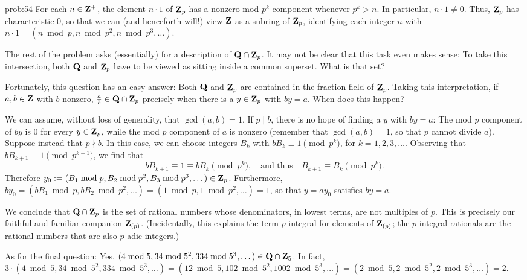 \begin{sol}{prob:54} For each $n \in \mathbf{Z}^{+}$, the element $n\cdot 1$ of $\mathbf{Z}_p$ has a nonzero mod $p^k$ component whenever $p^k > n$. In particular, $n\cdot 1\ne 0$. Thus, $\mathbf{Z}_p$ has characteristic $0$, so that we can (and henceforth will!) view $\mathbf{Z}$ as a subring of $\mathbf{Z}_p$, identifying each integer $n$ with $n\cdot 1 = (n\bmod{p}, n\bmod{p^2}, n\bmod{p^3},\dots)$.

The rest of the problem asks (essentially) for a description of $\mathbf{Q}\cap \mathbf{Z}_p$. It may not be clear that this task even makes sense: To take this intersection, both $\mathbf{Q}$ and $\mathbf{Z}_p$ have to be viewed as sitting inside a common superset. What is that set? 

Fortunately, this question has an easy answer: Both $\mathbf{Q}$ and $\mathbf{Z}_p$ are contained in the fraction field of $\mathbf{Z}_p$. Taking this interpretation, if $a, b \in \mathbf{Z}$ with $b$ nonzero, $\frac{a}{b} \in \mathbf{Q}\cap \mathbf{Z}_p$ precisely when there is a $y \in \mathbf{Z}_p$ with $by=a$. When does this happen?

We can assume, without loss of generality, that $\gcd(a,b)=1$. If $p\mid b$, there is no hope of finding a $y$ with $by=a$: The mod $p$ component of $by$ is $0$ for every $y\in \mathbf{Z}_p$, while the mod $p$ component of $a$ is nonzero (remember that $\gcd(a,b)=1$, so that $p$ cannot divide $a$). Suppose instead that $p\nmid b$. In this case, we can choose integers $B_k$ with $b B_k \equiv 1\pmod{p^k}$, for $k=1,2,3,\dots$. Observing that $bB_{k+1}\equiv 1\pmod{p^{k+1}}$, we find that 
\[ bB_{k+1} \equiv 1 \equiv b B_k \pmod{p^k},\quad\text{and thus}\quad  B_{k+1} \equiv B_k \pmod{p^k}. \] Therefore $y_0 := (B_1\bmod{p}, B_2\bmod{p^2}, B_3\bmod{p^3},\dots) \in \mathbf{Z}_p$. Furthermore, $by_0 = (bB_1 \bmod{p}, bB_2\bmod{p^2}, \dots) = (1\bmod{p}, 1\bmod{p^2},\dots) = 1$, so that $y=ay_0$ satisfies $by=a$.

We conclude that $\mathbf{Q}\cap\mathbf{Z}_{p}$ is the set of rational numbers whose denominators, in lowest terms, are not multiples of $p$. This is precisely our faithful and familiar companion $\mathbf{Z}_{(p)}$. (Incidentally, this explains the term \textsf{$p$-integral} for elements of $\mathbf{Z}_{(p)}$; the $p$-integral rationals are the rational numbers that are also $p$-adic integers.)

As for the final question: Yes, $(4\bmod{5}, 34\bmod{5^2}, 334\bmod{5^3},\dots) \in \mathbf{Q}\cap \mathbf{Z}_5$. In fact, $3\cdot (4\bmod{5}, 34\bmod{5^2}, 334\bmod{5^3},\dots) = (12\bmod{5}, 102\bmod{5^2}, 1002\bmod{5^3}, \dots) = (2\bmod{5}, 2\bmod{5^2}, 2\bmod{5^3},\dots) =2$. 
\end{sol}

